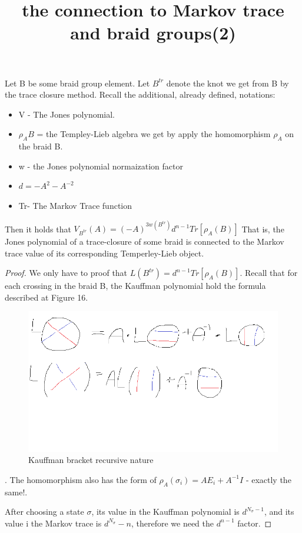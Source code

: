 \documentclass{article}
\begin{document}
\begin{theorem}
Let B be some braid group element. Let $B^{tr}$ denote the knot we get from B by the trace closure method. Recall the additional, already defined, notations:
\begin{itemize}
\item V - The Jones polynomial.
\item $\rho_{A}{B}$ = the Templey-Lieb algebra we get by apply the homomorphism $\rho_{A}$ on the braid B.
\item w - the Jones polynomial normaization factor
\item $d = -A^{2}-A^{-2}$
\item Tr- The Markov Trace function
\end{itemize}

Then it holds that
$V_{B^{tr}}(A) = (-A)^{3w(B^{tr})}d^{n-1}Tr[\rho_{A}(B)]$
That is, the Jones polynomial of a trace-closure of some braid is connected to the Markov trace value of its corresponding Temperley-Lieb object.
\end{theorem}

\begin{proof}
We only have to proof that $L(B^{tr}) = d^{n-1}Tr[\rho_{A}(B)]$. Recall that for each crossing in the braid B, the Kauffman polynomial hold the formula described at Figure 16.
\begin{figure}
\includegraphics[scale=0.2]{kauffman_bracket_identity} 
\caption{Kauffman bracket recursive nature}
\end{figure}.
The homomorphism also has the form of  $\rho_{A}(\sigma_{i}) = AE_{i} +A^{-1}I$ - exactly the same!.

\title{the connection to Markov trace and braid groups(2) }
After choosing a state $\sigma$, its value in the Kauffman polynomial is $d^{N_{\sigma} -1}$, and its
value i the Markov trace is $d^{N_{\sigma}} -n$, therefore we need the $d^{n-1}$ factor. 
 \end{proof}
\end{document}
